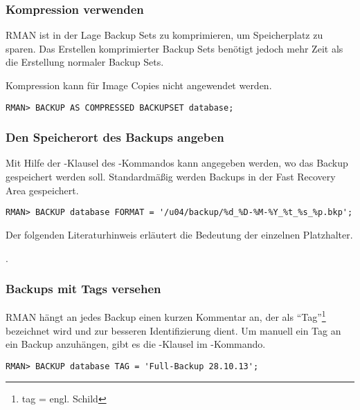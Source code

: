         \subsubsection{Kompression verwenden}
          RMAN ist in der Lage Backup Sets zu komprimieren, um Speicherplatz zu sparen. Das Erstellen komprimierter Backup Sets ben\"otigt jedoch mehr Zeit als die Erstellung normaler Backup Sets.
          \begin{merke}
            Kompression kann f\"ur Image Copies nicht angewendet werden.
          \end{merke}
          \begin{lstlisting}[caption={Ein komprimiertes Backup Set der Datenbank erstellen},label=admin1306,language=rman]
RMAN> BACKUP AS COMPRESSED BACKUPSET database;
          \end{lstlisting}
        \subsubsection{Den Speicherort des Backups angeben}
          Mit Hilfe der -Klausel des -Kommandos kann angegeben werden, wo das Backup gespeichert werden soll. Standardm\"a\ss{}ig werden Backups in der Fast Recovery Area gespeichert.
          \begin{lstlisting}[caption={Den Speicherort des Backups \"andern},label=admin1307,language=rman]
RMAN> BACKUP database FORMAT = '/u04/backup/%d_%D-%M-%Y_%t_%s_%p.bkp';
          \end{lstlisting}
          Der folgenden Literaturhinweis erl\"autert die Bedeutung der einzelnen Platzhalter.
          \begin{literaturinternet}
            \item \cite[formatSpec]{formatSpec}.
          \end{literaturinternet}
      \subsubsection{Backups mit Tags versehen}
          RMAN h\"angt an jedes Backup einen kurzen Kommentar an, der als \enquote{Tag}\footnote{tag = engl. Schild} bezeichnet wird und zur besseren Identifizierung dient. Um manuell ein Tag an ein Backup anzuh\"angen, gibt es die -Klausel im -Kommando.
          \begin{lstlisting}[caption={Ein Backup mit manuellem Tag versehen},label=admin1308,language=rman]
RMAN> BACKUP database TAG = 'Full-Backup 28.10.13';
          \end{lstlisting}
